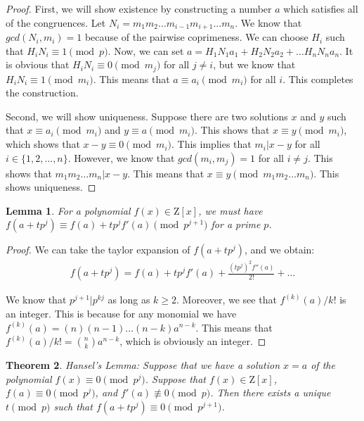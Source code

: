 \documentclass[psamsfonts]{amsart}
\newtheorem{thm}{Theorem}[section]
\newtheorem{lem}[thm]{Lemma}
\theoremstyle{definition}
\theoremstyle{remark}
\numberwithin{equation}{section}
\begin{document}
\begin{proof}
First, we will show existence by constructing a number $a$ which satisfies all of the congruences. Let $N_i = m_1 m_2 \ldots m_{i-1} m_{i+1} \ldots m_n$. We know that $gcd(N_i, m_i) = 1 $ because of the pairwise coprimeness. We can choose $H_i$ such that $H_i N_i \equiv 1 \pmod{p}$. Now, we can set $a = H_1 N_1 a_1 + H_2 N_2 a_2 + \ldots H_n N_n a_n$. It is obvious that $H_i N_i \equiv 0 \pmod{m_j}$ for all $j \neq i$, but we know that $H_i N_i \equiv 1 \pmod{m_i}$. This means that $a \equiv a_i \pmod{m_i}$ for all $i$. This completes the construction.

Second, we will show uniqueness. Suppose there are two solutions $x$ and $y$ such that $x \equiv a_i \pmod{m_i}$ and $y \equiv a \pmod{m_i}$. This shows that $x \equiv y \pmod{m_i}$, which shows that $x - y \equiv 0 \pmod{m_i}$. This implies that $m_i | x - y$ for all $i \in \{1,2, \ldots, n\}$. However, we know that $gcd(m_i, m_j) = 1$ for all $i \neq j$. This shows that $m_1 m_2 \ldots m_n | x - y$. This means that $x \equiv y \pmod{m_1 m_2 \ldots m_n}$. This shows uniqueness. 
\end{proof}

\begin{lem}
For a polynomial $f(x) \in \mathrm{Z}[x]$, we must have $f( a + t p^j) \equiv f(a) + t p^j f'(a) \pmod{p^{j+1}}$ for a prime $p$. 
\end{lem}

\begin{proof}
We can take the taylor expansion of $f(a+tp^j)$, and we obtain:
\begin{eqnarray}
f(a + t p^j) = f(a) + tp^j f'(a) + \frac{( t p^j)^2 f''(a)}{2!} + \ldots 
\end{eqnarray}

We know that $p^{j+1} | p^{kj}$ as long as $k \geq 2$. Moreover, we see that $f^{(k)}(a)/k!$ is an integer. This is because for any monomial we have $f^{(k)}(a) = (n)(n-1) \ldots (n-k) a^{n-k}$. This means that $f^{(k)}(a)/k! = {n \choose k} a^{n-k}$, which is obviously an integer.
\end{proof}

\begin{thm}
Hansel's Lemma: Suppose that we have a solution $x = a$ of the polynomial $f(x) \equiv 0 \pmod{p^j}$. Suppose that $f(x) \in \mathrm{Z}[x]$, $f(a) \equiv 0 \pmod{p^j}$, and $f'(a) \not \equiv 0 \pmod{p}$. Then there exists a unique $t \pmod{p}$ such that $f(a + t p^j) \equiv 0 \pmod{p^{j+1}}$.  
\end{thm}
\end{document}
